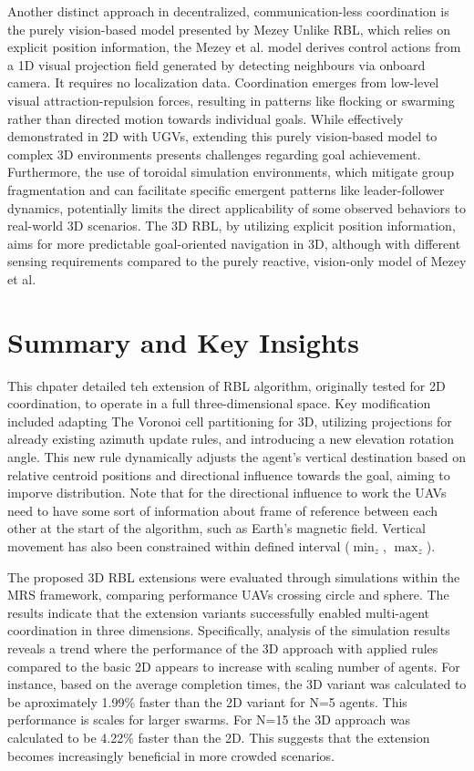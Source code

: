         Another distinct approach in decentralized, communication-less coordination is the purely vision-based model presented by Mezey \cite{mezey_pure_vision}
        Unlike RBL, which relies on explicit position information, the Mezey et al. model derives control actions from a 1D visual projection field generated by detecting neighbours via onboard camera. 
        It requires no localization data. Coordination emerges from low-level visual attraction-repulsion forces, resulting in patterns like flocking or swarming rather than directed motion towards individual goals. 
        While effectively demonstrated in 2D with \ac{UGV}s, extending this purely vision-based model to complex 3D environments presents challenges regarding goal achievement. 
        Furthermore, the use of toroidal simulation environments, which mitigate group fragmentation and can facilitate specific emergent patterns like leader-follower dynamics, potentially limits the direct applicability of some observed behaviors to real-world 3D scenarios.
        The 3D RBL, by utilizing explicit position information, aims for more predictable goal-oriented navigation in 3D, although with different sensing requirements compared to the purely reactive, vision-only model of Mezey et al. 
                
    \section{Summary and Key Insights}
        This chpater detailed teh extension of \ac{RBL} algorithm, originally tested for 2D coordination, to operate in a full three-dimensional space.
        Key modification included adapting The Voronoi cell partitioning for 3D, utilizing projections for already existing azimuth update rules, and introducing a new elevation rotation angle.
        This new rule dynamically adjusts the agent's vertical destination based on relative centroid positions and directional influence towards the goal, aiming to imporve distribution.
        Note that for the directional influence to work the \ac{UAV}s need to have some sort of information about frame of reference between each other at the start of the algorithm, such as Earth's magnetic field.
        Vertical movement has also been constrained within defined interval ($\min_z$, $\max_z$).

        The proposed 3D RBL extensions were evaluated through simulations within the MRS framework, comparing performance \ac{UAV}s crossing circle and sphere. 
        The results indicate that the extension variants successfully enabled multi-agent coordination in three dimensions.
        Specifically, analysis of the simulation results reveals a trend where the performance of the 3D approach with applied rules compared to the basic 2D appears to increase with scaling number of agents. 
        For instance, based on the average completion times, the 3D variant was calculated to be aproximately 1.99\% faster than the 2D variant for N=5 agents.
        This performance is scales for larger swarms.
        For N=15 the 3D approach was calculated to be 4.22\% faster than the 2D.
        This suggests that the extension becomes increasingly beneficial in more crowded scenarios.

